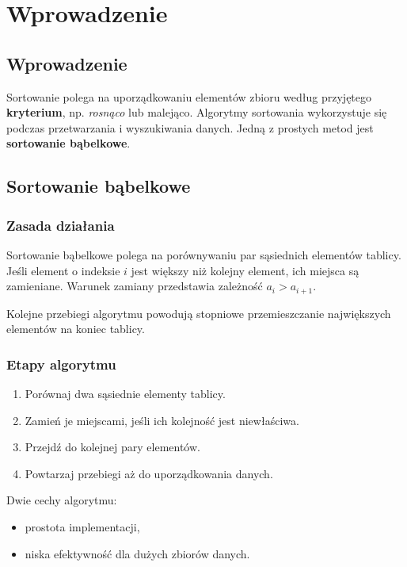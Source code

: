 \chapter{Wprowadzenie}
\label{chap:wprowadzenie}

\section{Wprowadzenie}

Sortowanie polega na uporządkowaniu elementów zbioru według przyjętego
\textbf{kryterium}, np. \textit{rosnąco} lub malejąco.
Algorytmy sortowania wykorzystuje się podczas przetwarzania i wyszukiwania danych.
Jedną z prostych metod jest \textbf{sortowanie bąbelkowe}.

\section{Sortowanie bąbelkowe}

    \subsection{Zasada działania}

    Sortowanie bąbelkowe polega na porównywaniu par sąsiednich elementów tablicy.
    Jeśli element o indeksie \(i\) jest większy niż kolejny element, ich miejsca
    są zamieniane. Warunek zamiany przedstawia zależność \(a_i > a_{i+1}\).

    Kolejne przebiegi algorytmu powodują stopniowe przemieszczanie największych
    elementów na koniec tablicy.

    \subsection{Etapy algorytmu}

    \begin{enumerate}
        \item Porównaj dwa sąsiednie elementy tablicy.
        \item Zamień je miejscami, jeśli ich kolejność jest niewłaściwa.
        \item Przejdź do kolejnej pary elementów.
        \item Powtarzaj przebiegi aż do uporządkowania danych.
    \end{enumerate}
    Dwie cechy algorytmu:
    \begin{itemize}
        \item prostota implementacji,
        \item niska efektywność dla dużych zbiorów danych.
    \end{itemize}

